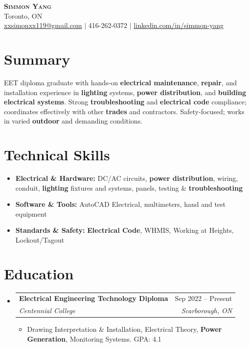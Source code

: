 \documentclass[letterpaper,11pt]{article}
\makeatletter
\newcommand{\resumeItem}[1]{\item\small{{#1 \vspace{-2pt}}}}
\newcommand{\resumeSubheading}[4]{
  \vspace{-4pt}\item
    \begin{tabular*}{0.97\textwidth}[t]{l@{\extracolsep{\fill}}r}
      \textbf{#1} & #2 \\
      \textit{\small #3} & \textit{\small #4} \\
    \end{tabular*}\vspace{-8pt}
}
\newcommand{\resumeSubHeadingListStart}{\begin{itemize}[leftmargin=0.15in, label={}]}
\newcommand{\resumeSubHeadingListEnd}{\end{itemize}}
\newcommand{\resumeItemListStart}{\begin{itemize}}
\newcommand{\resumeItemListEnd}{\end{itemize}\vspace{-5pt}}
\makeatother
\begin{document}
\begin{center}
    \textbf{\Huge \scshape Simmon Yang} \\ \vspace{1pt}
    Toronto, ON \\ 
    \href{mailto:xxsimonxx119@gmail.com}{xxsimonxx119@gmail.com} $|$ 416-262-0372 $|$ 
    \href{https://www.linkedin.com/in/simmon-yang/}{linkedin.com/in/simmon-yang}
\end{center}

\section{Summary}
EET diploma graduate with hands-on \textbf{electrical maintenance}, \textbf{repair}, and installation experience in \textbf{lighting} systems, \textbf{power distribution}, and \textbf{building electrical systems}. Strong \textbf{troubleshooting} and \textbf{electrical code} compliance; coordinates effectively with other \textbf{trades} and contractors. Safety-focused; works in varied \textbf{outdoor} and demanding conditions.

\section{Technical Skills}
\begin{itemize}[leftmargin=0.15in]
  \item \textbf{Electrical \& Hardware:} DC/AC circuits, \textbf{power distribution}, wiring, conduit, \textbf{lighting} fixtures and systems, panels, testing \& \textbf{troubleshooting}
  \item \textbf{Software \& Tools:} AutoCAD Electrical, multimeters, hand and test equipment
  \item \textbf{Standards \& Safety:} \textbf{Electrical Code}, WHMIS, Working at Heights, Lockout/Tagout
\end{itemize}

\section{Education}
\resumeSubHeadingListStart
\resumeSubheading
  {Electrical Engineering Technology Diploma}{Sep 2022 -- Present}
  {Centennial College}{Scarborough, ON}
\resumeItemListStart
  \resumeItem{Drawing Interpretation \& Installation, Electrical Theory, \textbf{Power Generation}, Monitoring Systems. GPA: 4.1}
\resumeItemListEnd
\resumeSubHeadingListEnd
\end{document}
